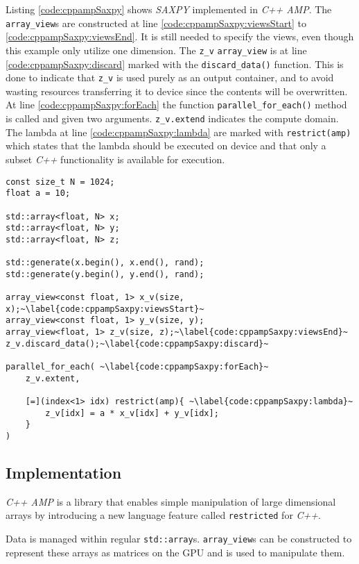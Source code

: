 Listing \ref{code:cppampSaxpy} shows \textit{SAXPY} implemented in \textit{C++ AMP}. The \texttt{array\_view}s are constructed at line \ref{code:cppampSaxpy:viewsStart} to \ref{code:cppampSaxpy:viewsEnd}. It is still needed to specify the views, even though this example only utilize one dimension. The \texttt{z\_v} \texttt{array\_view} is at line \ref{code:cppampSaxpy:discard} marked with the \texttt{discard\_data()} function. This is done to indicate that \texttt{z\_v} is used purely as an output container, and to avoid wasting resources transferring it to device since the contents will be overwritten.
At line \ref{code:cppampSaxpy:forEach} the function \texttt{parallel\_for\_each()} method is called and given two arguments. \texttt{z\_v.extend} indicates the compute domain. The lambda at line \ref{code:cppampSaxpy:lambda} are marked with \texttt{restrict(amp)} which states that the lambda should be executed on device and that only a subset \textit{C++} functionality is available for execution.
\begin{lstlisting}[caption={\textit{C++ AMP} \textit{SAXPY} example.}, label={code:cppampSaxpy}]
const size_t N = 1024;
float a = 10;

std::array<float, N> x;
std::array<float, N> y;
std::array<float, N> z;

std::generate(x.begin(), x.end(), rand);
std::generate(y.begin(), y.end(), rand);

array_view<const float, 1> x_v(size, x);~\label{code:cppampSaxpy:viewsStart}~
array_view<const float, 1> y_v(size, y);
array_view<float, 1> z_v(size, z);~\label{code:cppampSaxpy:viewsEnd}~
z_v.discard_data();~\label{code:cppampSaxpy:discard}~

parallel_for_each( ~\label{code:cppampSaxpy:forEach}~
    z_v.extent,

    [=](index<1> idx) restrict(amp){ ~\label{code:cppampSaxpy:lambda}~
        z_v[idx] = a * x_v[idx] + y_v[idx];
    }
)
\end{lstlisting}

\subsection{Implementation}

\textit{C++ AMP} is a library that enables simple manipulation of large dimensional arrays by introducing a new language feature called \texttt{restricted} for \textit{C++}. 

Data is managed within regular \texttt{std::array}s. \texttt{array\_view}s can be constructed to represent these arrays as matrices on the GPU and is used to manipulate them.

